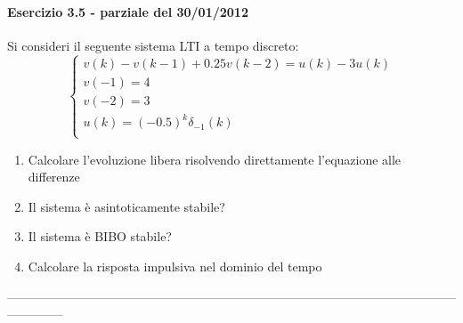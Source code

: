 \documentclass[12pt,a4paper]{article}
\begin{document}
	\paragraph*{Esercizio 3.5 - parziale del 30/01/2012} Si consideri il seguente sistema LTI a tempo discreto:
	\[
		\begin{cases}
			v(k) - v(k-1) + 0.25v(k-2) = u(k) - 3u(k)\\
			v(-1) = 4\\
			v(-2) = 3\\
			u(k) = (-0.5)^k\delta_{-1}(k)\\
		\end{cases}
	\]
	\begin{enumerate}
		\item Calcolare l'evoluzione libera risolvendo direttamente l'equazione alle differenze
		\item Il sistema \`e asintoticamente stabile?
		\item Il sistema \`e BIBO stabile?
		\item Calcolare la risposta impulsiva nel dominio del tempo
	\end{enumerate}
	--------------------------------------------------------------------------------------------------------------------------\\
\end{document}
